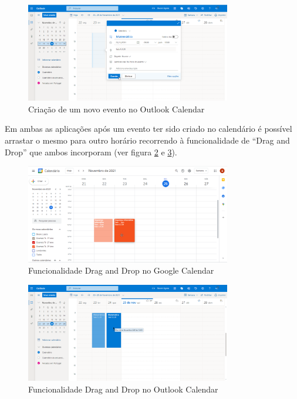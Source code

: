 \documentclass[11pt, twoside]{report}
\begin{document}
	\begin{figure}[H] 
		\centering
		\includegraphics[width=0.8\textwidth,height=0.8\textheight,keepaspectratio]{image/estadodearte/criacao_evento_outlook}
		\caption{Criação de um novo evento no Outlook Calendar}
		\label{outlookevento}
	\end{figure}

Em ambas as aplicações após um evento ter sido criado no calendário é possível arrastar o mesmo para outro horário recorrendo à funcionalidade de ``Drag and Drop'' que ambos incorporam (ver figura \ref{googledragdrop} e \ref{outlookdragdrop}).\\

	\begin{figure}[H] 
		\centering
		\includegraphics[width=0.8\textwidth,height=0.8\textheight,keepaspectratio]{image/estadodearte/drag_drop_google}
		\caption{Funcionalidade Drag and Drop no Google Calendar}
		\label{googledragdrop}
	\end{figure}

	\begin{figure}[H] 
		\centering
		\includegraphics[width=0.8\textwidth,height=0.8\textheight,keepaspectratio]{image/estadodearte/drag_drop_outlook}
		\caption{Funcionalidade Drag and Drop no Outlook Calendar}
		\label{outlookdragdrop}
	\end{figure}
\end{document}
